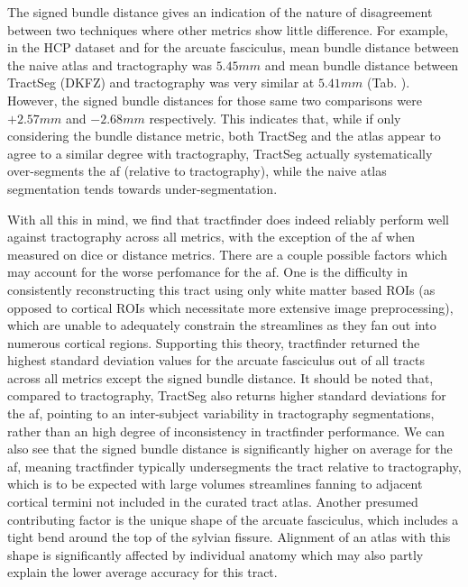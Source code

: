 The signed bundle distance gives an indication of the nature of disagreement between two techniques where other metrics show little difference.
For example, in the HCP dataset and for the arcuate fasciculus, mean bundle distance between the naive atlas and tractography was $5.45 mm$ and mean bundle distance between TractSeg (DKFZ) and tractography was very similar at $5.41 mm$ (Tab. ).
However, the signed bundle distances for those same two comparisons were $+2.57 mm$ and $-2.68 mm$ respectively.
This indicates that, while if only considering the bundle distance metric, both TractSeg and the atlas appear to agree to a similar degree with tractography, TractSeg actually systematically over-segments the \gls{af} (relative to tractography), while the naive atlas segmentation tends towards under-segmentation.

With all this in mind, we find that tractfinder does indeed reliably perform well against tractography across all metrics, with the exception of the \gls{af} when measured on \gls{dice} or distance metrics.
There are a couple possible factors which may account for the worse perfomance for the \gls{af}.
One is the difficulty in consistently reconstructing this tract using only white matter based ROIs (as opposed to cortical ROIs which necessitate more extensive image preprocessing), which are unable to adequately constrain the streamlines as they fan out into numerous cortical regions.
Supporting this theory, tractfinder returned the highest standard deviation values for the arcuate fasciculus out of all  tracts across all metrics except the signed bundle distance.
It should be noted that, compared to tractography, TractSeg also returns higher standard deviations for the \gls{af}, pointing to an inter-subject variability in tractography segmentations, rather than an high degree of inconsistency in tractfinder performance.
We can also see that the signed bundle distance is significantly higher on average for the \gls{af}, meaning tractfinder typically undersegments the tract relative to tractography, which is to be expected with large volumes streamlines fanning to adjacent cortical termini not included in the curated tract atlas.
Another presumed contributing factor is the unique shape of the arcuate fasciculus, which includes a tight bend around the top of the sylvian fissure.
Alignment of an atlas with this shape is significantly affected by individual anatomy  which may also partly explain the lower average accuracy for this tract.

